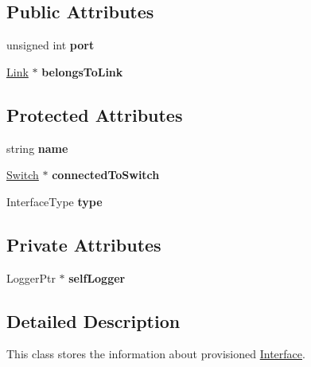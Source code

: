 \subsection*{\-Public \-Attributes}
\begin{DoxyCompactItemize}
\item 
\hypertarget{classInterface_a509fc97ac93f1bc721593701ad7796c9}{unsigned int {\bfseries port}}\label{classInterface_a509fc97ac93f1bc721593701ad7796c9}

\item 
\hypertarget{classInterface_afd82cf3220b0074e83d731b2522e3362}{\hyperlink{classLink}{\-Link} $\ast$ {\bfseries belongs\-To\-Link}}\label{classInterface_afd82cf3220b0074e83d731b2522e3362}

\end{DoxyCompactItemize}
\subsection*{\-Protected \-Attributes}
\begin{DoxyCompactItemize}
\item 
\hypertarget{classInterface_a5833dfd3f3d46d0e584d9c37aa3a1165}{string {\bfseries name}}\label{classInterface_a5833dfd3f3d46d0e584d9c37aa3a1165}

\item 
\hypertarget{classInterface_aa8466a244c6b56c3f56b966b67e0e557}{\hyperlink{classSwitch}{\-Switch} $\ast$ {\bfseries connected\-To\-Switch}}\label{classInterface_aa8466a244c6b56c3f56b966b67e0e557}

\item 
\hypertarget{classInterface_ab74e49bbb618eb9b7f35014a3e73231e}{\-Interface\-Type {\bfseries type}}\label{classInterface_ab74e49bbb618eb9b7f35014a3e73231e}

\end{DoxyCompactItemize}
\subsection*{\-Private \-Attributes}
\begin{DoxyCompactItemize}
\item 
\hypertarget{classInterface_a6b054f3eca3944a593b267b57422efd4}{\-Logger\-Ptr $\ast$ {\bfseries self\-Logger}}\label{classInterface_a6b054f3eca3944a593b267b57422efd4}

\end{DoxyCompactItemize}


\subsection{\-Detailed \-Description}
\-This class stores the information about provisioned \hyperlink{classInterface}{\-Interface}. 

